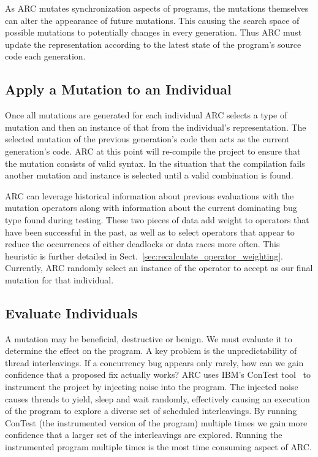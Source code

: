 \documentclass{llncs}
\begin{document}
As ARC mutates synchronization aspects of programs, the mutations themselves
can alter the appearance of future mutations. This causing the search space of
possible mutations to potentially changes in every generation. Thus ARC must
update the representation according to the latest state of the program's source
code each generation.

\subsection{Apply a Mutation to an Individual}
\label{sec:mutate_individuals}

Once all mutations are generated for each individual ARC selects a type of
mutation and then an instance of that from the individual's representation. The
selected mutation of the previous generation's code then acts as the current
generation's code. ARC at this point will re-compile the project to ensure that
the mutation consists of valid syntax. In the situation that the compilation
fails another mutation and instance is selected until a valid combination is
found.

ARC can leverage historical information about previous evaluations with the
mutation operators along with information about the current dominating bug type
found during testing. These two pieces of data add weight to operators
that have been successful in the past, as well as to select operators that
appear to reduce the occurrences of either deadlocks or data races more often.
This heuristic is further detailed in
Sect.~\ref{sec:recalculate_operator_weighting}. Currently, ARC randomly select
an instance of the operator to accept as our final mutation for that
individual.

\subsection{Evaluate Individuals}
\label{sec:evalute_individuals}

A mutation may be beneficial, destructive or benign. We must evaluate it to
determine the effect on the program. A key problem is the unpredictability of
thread interleavings. If a concurrency bug appears only rarely, how can we gain
confidence that a proposed fix actually works? ARC uses IBM's ConTest
tool~\cite{EFN+02} to instrument the project by injecting noise into the
program. The injected noise causes threads to yield, sleep and wait randomly,
effectively causing an execution of the program to explore a diverse set of
scheduled interleavings. By running ConTest (the instrumented version of the
program) multiple times we gain more confidence that a larger set of the
interleavings are explored. Running the instrumented program multiple times is
the most time consuming aspect of ARC.
\end{document}
